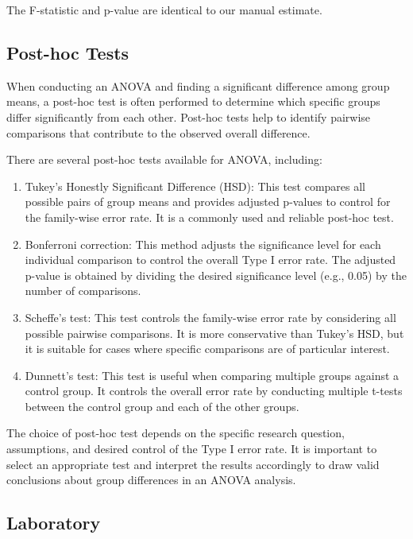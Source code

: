 \documentclass[
]{article}
\begin{document}
The F-statistic and p-value are identical to our manual estimate.

\hypertarget{post-hoc-tests}{%
\subsection{Post-hoc Tests}\label{post-hoc-tests}}

When conducting an ANOVA and finding a significant difference among group means, a post-hoc test is often performed to determine which specific groups differ significantly from each other. Post-hoc tests help to identify pairwise comparisons that contribute to the observed overall difference.

There are several post-hoc tests available for ANOVA, including:

\begin{enumerate}
\def\labelenumi{\arabic{enumi}.}
\item
  Tukey's Honestly Significant Difference (HSD): This test compares all possible pairs of group means and provides adjusted p-values to control for the family-wise error rate. It is a commonly used and reliable post-hoc test.
\item
  Bonferroni correction: This method adjusts the significance level for each individual comparison to control the overall Type I error rate. The adjusted p-value is obtained by dividing the desired significance level (e.g., 0.05) by the number of comparisons.
\item
  Scheffe's test: This test controls the family-wise error rate by considering all possible pairwise comparisons. It is more conservative than Tukey's HSD, but it is suitable for cases where specific comparisons are of particular interest.
\item
  Dunnett's test: This test is useful when comparing multiple groups against a control group. It controls the overall error rate by conducting multiple t-tests between the control group and each of the other groups.
\end{enumerate}

The choice of post-hoc test depends on the specific research question, assumptions, and desired control of the Type I error rate. It is important to select an appropriate test and interpret the results accordingly to draw valid conclusions about group differences in an ANOVA analysis.

\hypertarget{laboratory-4}{%
\subsection{Laboratory}\label{laboratory-4}}
\end{document}
